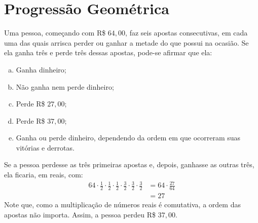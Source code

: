 \section{Progressão Geométrica}

\begin{example}
Uma pessoa, começando com R\$ $64{,}00$, faz seis apostas consecutivas, em cada uma das quais arrisca perder ou ganhar a metade do que possui na ocasião. Se ela ganha três e perde três dessas apostas, pode-se afirmar que ela:
%
\begin{enumerate}[a)]
  \item Ganha dinheiro;
  \item Não ganha nem perde dinheiro;
  \item Perde R\$ $27{,}00$;
  \item Perde R\$ $37{,}00$;
  \item Ganha ou perde dinheiro, dependendo da ordem em que ocorreram suas vitórias e derrotas.
\end{enumerate}
\end{example}

\begin{solution}
Se a pessoa perdesse as três primeiras apostas e, depois, ganhasse as outras três, ela ficaria, em reais, com:
%
\begin{align*}
64 \cdot \frac 1 2 \cdot \frac 1 2 \cdot \frac 1 2 \cdot \frac 3 2\cdot \frac 3 2\cdot \frac 3 2 &= 64 \cdot \frac {27} {64} \\ &= 27
\end{align*}
%
Note que, como a multiplicação de números reais é comutativa, a ordem das apostas não importa. Assim, a pessoa perdeu R\$ $37{,}00$.
\end{solution}
